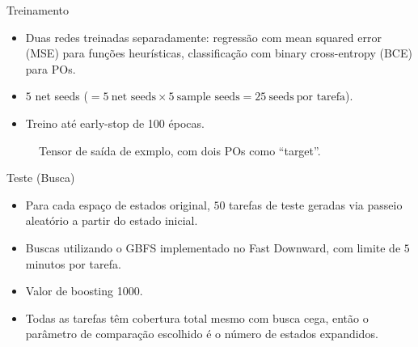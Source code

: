 \documentclass{beamer}
\begin{document}
\begin{frame}{Treinamento}
\begin{itemize}
  \item Duas redes treinadas separadamente: \alert{regressão} com mean squared error (MSE) para funções heurísticas, \alert{classificação} com binary cross-entropy (BCE) para POs.
  \pause
  \item $5$ net seeds ($= 5~\text{net seeds} \times 5~\text{sample seeds} = 25~\text{seeds}~\text{por tarefa}$).
  \pause
  \item Treino até \alert{early-stop} de 100 épocas. %
\end{itemize}

\pause
\begin{figure}[tb]
\caption[]{Tensor de saída de exmplo, com dois POs como ``target''.}
\centering
{}
\label{fig:po-tensor}
\end{figure}

\end{frame}

\begin{frame}{Teste (Busca)}
\begin{itemize}
  \item Para cada espaço de estados original, \alert{$50$ tarefas de teste} geradas via passeio aleatório a partir do estado inicial.
  \pause
  \item Buscas utilizando o GBFS implementado no Fast Downward, com limite de \alert{$5$ minutos} por tarefa.
  \pause
  \item Valor de \alert{boosting 1000}.
  \pause
  \item Todas as tarefas têm cobertura total mesmo com busca cega, então o parâmetro de comparação escolhido é o \alert{número de estados expandidos}.
\end{itemize}
\end{frame}
\end{document}
